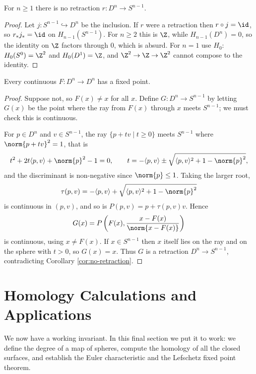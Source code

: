 \begin{corollary} \label{cor:no-retraction}
	For $n \geq 1$ there is no retraction $r: D^n \to S^{n-1}$.
\end{corollary}
\begin{proof}
	Let $j: S^{n-1}\hookrightarrow D^n$ be the inclusion. If $r$ were a retraction then $r\circ j = \id$, so $r_*j_* = \id$ on $H_{n-1}(S^{n-1})$. For $n \geq 2$ this is $\Z$, while $H_{n-1}(D^n) = 0$, so the identity on $\Z$ factors through $0$, which is absurd. For $n = 1$ use $H_0$: $H_0(S^0) = \Z^2$ and $H_0(D^1) = \Z$, and $\Z^2 \to \Z \to \Z^2$ cannot compose to the identity.
\end{proof}

\begin{theorem} \label{at-thm:brouwer}
	Every continuous $F: D^n \to D^n$ has a fixed point.
\end{theorem}
\begin{proof}
	Suppose not, so $F(x)\neq x$ for all $x$. Define $G: D^n \to S^{n-1}$ by letting $G(x)$ be the point where the ray from $F(x)$ through $x$ meets $S^{n-1}$; we must check this is continuous.

	For $p \in D^n$ and $v\in S^{n-1}$, the ray $\{p+tv \mid t \geq 0\}$ meets $S^{n-1}$ where $\norm{p+tv}^2 = 1$, that is
	$$
	t^2 + 2t\langle p,v\rangle + \norm{p}^2 - 1 = 0, \qquad t = -\langle p,v\rangle \pm \sqrt{\langle p,v\rangle^2+1-\norm{p}^2},
	$$
	and the discriminant is non-negative since $\norm{p}\leq 1$. Taking the larger root,
	$$
	\tau(p,v) = -\langle p,v\rangle + \sqrt{\langle p,v\rangle^2+1-\norm{p}^2}
	$$
	is continuous in $(p,v)$, and so is $P(p,v) = p + \tau(p,v)v$. Hence
	$$
	G(x) = P\left(F(x), \frac{x-F(x)}{\norm{x-F(x)}}\right)
	$$
	is continuous, using $x \neq F(x)$. If $x \in S^{n-1}$ then $x$ itself lies on the ray and on the sphere with $t > 0$, so $G(x) = x$. Thus $G$ is a retraction $D^n \to S^{n-1}$, contradicting Corollary \ref{cor:no-retraction}.
\end{proof}

\section{Homology Calculations and Applications}

We now have a working invariant. In this final section we put it to work: we define the
degree of a map of spheres, compute the homology of all the closed surfaces, and
establish the Euler characteristic and the Lefschetz fixed point theorem.

